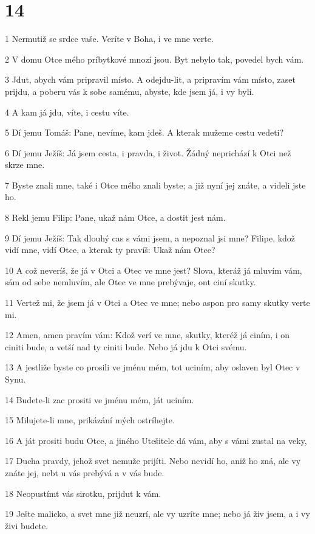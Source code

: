 \chapter{14}

\par 1 Nermutiž se srdce vaše. Veríte v Boha, i ve mne verte.
\par 2 V domu Otce mého príbytkové mnozí jsou. Byt nebylo tak, povedel bych vám.
\par 3 Jdut, abych vám pripravil místo. A odejdu-lit, a pripravím vám místo, zaset prijdu, a poberu vás k sobe samému, abyste, kde jsem já, i vy byli.
\par 4 A kam já jdu, víte, i cestu víte.
\par 5 Dí jemu Tomáš: Pane, nevíme, kam jdeš. A kterak mužeme cestu vedeti?
\par 6 Dí jemu Ježíš: Já jsem cesta, i pravda, i život. Žádný neprichází k Otci než skrze mne.
\par 7 Byste znali mne, také i Otce mého znali byste; a již nyní jej znáte, a videli jste ho.
\par 8 Rekl jemu Filip: Pane, ukaž nám Otce, a dostit jest nám.
\par 9 Dí jemu Ježíš: Tak dlouhý cas s vámi jsem, a nepoznal jsi mne? Filipe, kdož vidí mne, vidí Otce, a kterak ty pravíš: Ukaž nám Otce?
\par 10 A což neveríš, že já v Otci a Otec ve mne jest? Slova, kteráž já mluvím vám, sám od sebe nemluvím, ale Otec ve mne prebývaje, ont ciní skutky.
\par 11 Vertež mi, že jsem já v Otci a Otec ve mne; nebo aspon pro samy skutky verte mi.
\par 12 Amen, amen pravím vám: Kdož verí ve mne, skutky, kteréž já ciním, i on ciniti bude, a vetší nad ty ciniti bude. Nebo já jdu k Otci svému.
\par 13 A jestliže byste co prosili ve jménu mém, tot uciním, aby oslaven byl Otec v Synu.
\par 14 Budete-li zac prositi ve jménu mém, ját uciním.
\par 15 Milujete-li mne, prikázání mých ostríhejte.
\par 16 A ját prositi budu Otce, a jiného Utešitele dá vám, aby s vámi zustal na veky,
\par 17 Ducha pravdy, jehož svet nemuže prijíti. Nebo nevidí ho, aniž ho zná, ale vy znáte jej, nebt u vás prebývá a v vás bude.
\par 18 Neopustímt vás sirotku, prijdut k vám.
\par 19 Ješte malicko, a svet mne již neuzrí, ale vy uzríte mne; nebo já živ jsem, a i vy živi budete.
